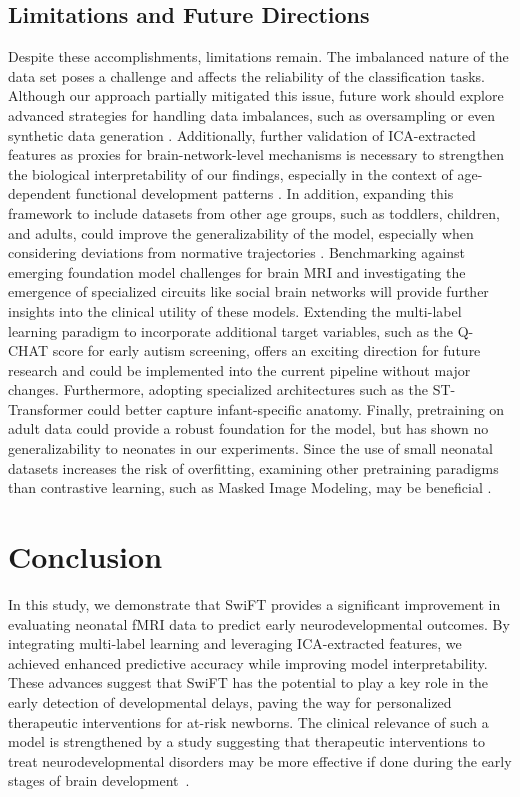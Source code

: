 \documentclass[runningheads,a4paper]{llncs}
\begin{document}
\subsection{Limitations and Future Directions}
%
Despite these accomplishments, limitations remain. The imbalanced nature of the data set poses a challenge and affects the reliability of the classification tasks. Although our approach partially mitigated this issue, future work should explore advanced strategies for handling data imbalances, such as oversampling or even synthetic data generation \cite{Zhang2024Preterm}. Additionally, further validation of ICA-extracted features as proxies for brain-network-level mechanisms is necessary to strengthen the biological interpretability of our findings, especially in the context of age-dependent functional development patterns \cite{Zhao2024AgeDependent}. In addition, expanding this framework to include datasets from other age groups, such as toddlers, children, and adults, could improve the generalizability of the model, especially when considering deviations from normative trajectories \cite{bioRxiv2024BrainAge}. Benchmarking against emerging foundation model challenges for brain MRI \cite{FOMO2025} and investigating the emergence of specialized circuits like social brain networks \cite{NatureHB2024Social} will provide further insights into the clinical utility of these models. Extending the multi-label learning paradigm to incorporate additional target variables, such as the Q-CHAT score for early autism screening, offers an exciting direction for future research and could be implemented into the current pipeline without major changes. Furthermore, adopting specialized architectures such as the ST-Transformer \cite{STTransformer2025} could better capture infant-specific anatomy. Finally, pretraining on adult data could provide a robust foundation for the model, but has shown no generalizability to neonates in our experiments. Since the use of small neonatal datasets increases the risk of overfitting, examining other pretraining paradigms than contrastive learning, such as Masked Image Modeling, may be beneficial \cite{MedImgAnal2024SSL,NatureComm2024Scaling}.

\section{Conclusion}
\label{sec:conclusion}
%
In this study, we demonstrate that SwiFT provides a significant improvement in evaluating neonatal fMRI data to predict early neurodevelopmental outcomes. By integrating multi-label learning and leveraging ICA-extracted features, we achieved enhanced predictive accuracy while improving model interpretability. These advances suggest that SwiFT has the potential to play a key role in the early detection of developmental delays, paving the way for personalized therapeutic interventions for at-risk newborns. The clinical relevance of such a model is strengthened by a study suggesting that therapeutic interventions to treat neurodevelopmental disorders may be more effective if done during the early stages of brain development~\cite{SVALINA2022}.
%
\end{document}
